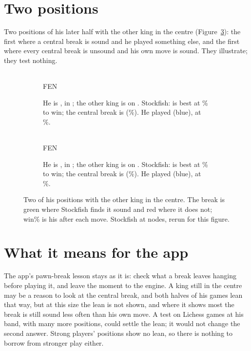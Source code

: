 \documentclass[11pt]{article}
\begin{document}
\ArmTable

\section{Two positions}

Two positions of his later half with the other king in the centre (Figure~\ref{fig:examples}): the
first where a central break is sound and he played something else, and the first where every
central break is unsound and his own move is sound. They illustrate; they test nothing.

\begin{figure}[ht]
\centering
\begin{subfigure}[t]{0.48\textwidth}
\centering
\EaBoard\\[0.3em]
{\footnotesize FEN \EaFen}
\caption{He is \EaMover, in \EaStructure; the other king is on \EaKing. Stockfish: \EaBest{} is
best at \EaWpBest\% to win; the central break \EaBreak{} is \EaBreakSound{} (\EaWpBreak\%). He
played \EaPlayed{} (blue), \EaPlayedSound{} at \EaWpPlayed\%.}
\label{fig:struck}
\end{subfigure}\hfill
\begin{subfigure}[t]{0.48\textwidth}
\centering
\EbBoard\\[0.3em]
{\footnotesize FEN \EbFen}
\caption{He is \EbMover, in \EbStructure; the other king is on \EbKing. Stockfish: \EbBest{} is
best at \EbWpBest\% to win; the central break \EbBreak{} is \EbBreakSound{} (\EbWpBreak\%). He
played \EbPlayed{} (blue), \EbPlayedSound{} at \EbWpPlayed\%.}
\label{fig:trailed}
\end{subfigure}
\caption{Two of his positions with the other king in the centre. The break is green where
Stockfish finds it sound and red where it does not; win\% is his after each move. Stockfish at
\GradeNodes{} nodes, rerun for this figure.}
\label{fig:examples}
\end{figure}

\section{What it means for the app}

The app's pawn-break lesson stays as it is: check what a break leaves hanging before playing it,
and leave the moment to the engine. A king still in the centre may be a reason to look at the
central break, and both halves of his games lean that way, but at this size the lean is not shown,
and where it shows most the break is still sound less often than his own move. A test on Lichess
games at his band, with many more positions, could settle the lean; it would not change the second
answer. Strong players' positions show no lean, so there is nothing to borrow from stronger play
either.
\end{document}
